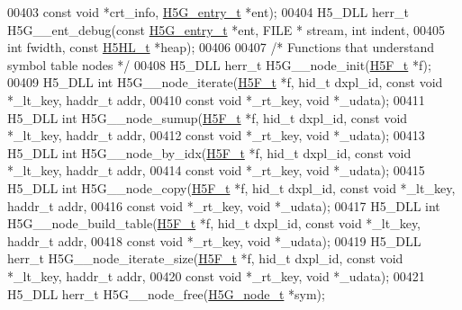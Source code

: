 \begin{DoxyCode}
00403     \textcolor{keyword}{const} \textcolor{keywordtype}{void} *crt\_info, \hyperlink{struct_h5_g__entry__t}{H5G\_entry\_t} *ent);
00404 H5\_DLL herr\_t H5G\_\_ent\_debug(\textcolor{keyword}{const} \hyperlink{struct_h5_g__entry__t}{H5G\_entry\_t} *ent, FILE * stream, \textcolor{keywordtype}{int} indent,
00405     \textcolor{keywordtype}{int} fwidth, \textcolor{keyword}{const} \hyperlink{struct_h5_h_l__t}{H5HL\_t} *heap);
00406 
00407 \textcolor{comment}{/* Functions that understand symbol table nodes */}
00408 H5\_DLL herr\_t H5G\_\_node\_init(\hyperlink{struct_h5_f__t}{H5F\_t} *f);
00409 H5\_DLL \textcolor{keywordtype}{int} H5G\_\_node\_iterate(\hyperlink{struct_h5_f__t}{H5F\_t} *f, hid\_t dxpl\_id, \textcolor{keyword}{const} \textcolor{keywordtype}{void} *\_lt\_key, haddr\_t addr,
00410              \textcolor{keyword}{const} \textcolor{keywordtype}{void} *\_rt\_key, \textcolor{keywordtype}{void} *\_udata);
00411 H5\_DLL \textcolor{keywordtype}{int} H5G\_\_node\_sumup(\hyperlink{struct_h5_f__t}{H5F\_t} *f, hid\_t dxpl\_id, \textcolor{keyword}{const} \textcolor{keywordtype}{void} *\_lt\_key, haddr\_t addr,
00412              \textcolor{keyword}{const} \textcolor{keywordtype}{void} *\_rt\_key, \textcolor{keywordtype}{void} *\_udata);
00413 H5\_DLL \textcolor{keywordtype}{int} H5G\_\_node\_by\_idx(\hyperlink{struct_h5_f__t}{H5F\_t} *f, hid\_t dxpl\_id, \textcolor{keyword}{const} \textcolor{keywordtype}{void} *\_lt\_key, haddr\_t addr,
00414              \textcolor{keyword}{const} \textcolor{keywordtype}{void} *\_rt\_key, \textcolor{keywordtype}{void} *\_udata);
00415 H5\_DLL \textcolor{keywordtype}{int} H5G\_\_node\_copy(\hyperlink{struct_h5_f__t}{H5F\_t} *f, hid\_t dxpl\_id, \textcolor{keyword}{const} \textcolor{keywordtype}{void} *\_lt\_key, haddr\_t addr,
00416              \textcolor{keyword}{const} \textcolor{keywordtype}{void} *\_rt\_key, \textcolor{keywordtype}{void} *\_udata);
00417 H5\_DLL \textcolor{keywordtype}{int} H5G\_\_node\_build\_table(\hyperlink{struct_h5_f__t}{H5F\_t} *f, hid\_t dxpl\_id, \textcolor{keyword}{const} \textcolor{keywordtype}{void} *\_lt\_key, haddr\_t addr,
00418              \textcolor{keyword}{const} \textcolor{keywordtype}{void} *\_rt\_key, \textcolor{keywordtype}{void} *\_udata);
00419 H5\_DLL herr\_t H5G\_\_node\_iterate\_size(\hyperlink{struct_h5_f__t}{H5F\_t} *f, hid\_t dxpl\_id, \textcolor{keyword}{const} \textcolor{keywordtype}{void} *\_lt\_key, haddr\_t addr,
00420                      \textcolor{keyword}{const} \textcolor{keywordtype}{void} *\_rt\_key, \textcolor{keywordtype}{void} *\_udata);
00421 H5\_DLL herr\_t H5G\_\_node\_free(\hyperlink{struct_h5_g__node__t}{H5G\_node\_t} *sym);

\end{DoxyCode}
